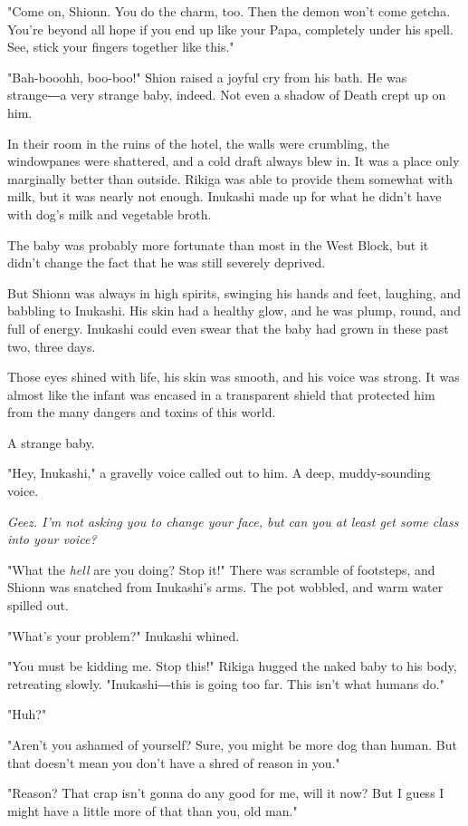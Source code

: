 "Come on, Shionn. You do the charm, too. Then the demon won't come
getcha. You're beyond all hope if you end up like your Papa, completely
under his spell. See, stick your fingers together like this."

"Bah-booohh, boo-boo!" Shion raised a joyful cry from his bath. He was
strange―a very strange baby, indeed. Not even a shadow of Death crept up
on him.

In their room in the ruins of the hotel, the walls were crumbling, the
windowpanes were shattered, and a cold draft always blew in. It was a
place only marginally better than outside. Rikiga was able to provide
them somewhat with milk, but it was nearly not enough. Inukashi made up
for what he didn't have with dog's milk and vegetable broth.

The baby was probably more fortunate than most in the West Block, but it
didn't change the fact that he was still severely deprived.

But Shionn was always in high spirits, swinging his hands and feet,
laughing, and babbling to Inukashi. His skin had a healthy glow, and he
was plump, round, and full of energy. Inukashi could even swear that the
baby had grown in these past two, three days.

Those eyes shined with life, his skin was smooth, and his voice was
strong. It was almost like the infant was encased in a transparent
shield that protected him from the many dangers and toxins of this
world.

A strange baby.

"Hey, Inukashi," a gravelly voice called out to him. A deep,
muddy-sounding voice.

\emph{Geez. I'm not asking you to change your face, but can you at least get
	some class into your voice?}

"What the \emph{hell} are you doing? Stop it!" There was scramble of footsteps,
and Shionn was snatched from Inukashi's arms. The pot wobbled, and warm
water spilled out.

"What's your problem?" Inukashi whined.

"You must be kidding me. Stop this!" Rikiga hugged the naked baby to his
body, retreating slowly. "Inukashi―this is going too far. This isn't
what humans do."

"Huh?"

"Aren't you ashamed of yourself? Sure, you might be more dog than human.
But that doesn't mean you don't have a shred of reason in you."

"Reason? That crap isn't gonna do any good for me, will it now? But I
guess I might have a little more of that than you, old man."

